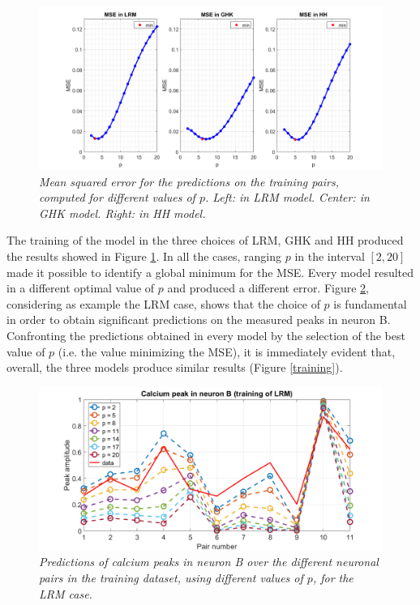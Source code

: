 \documentclass[12pt, a4paper]{report}
\begin{document}
\begin{figure}[H]
	\begin{center}
		\hspace*{-1.6 cm}
		\includegraphics[scale=0.5]{MSE.png} 
	\end{center} 
	\caption{\textit{Mean squared error for the predictions on the training pairs, computed for different values of $p$. Left: in LRM model. Center: in GHK model. Right: in HH model. }}
	\label{mse}
\end{figure}

The training of the model in the three choices of LRM, GHK and HH produced the results showed in Figure \ref{mse}. In all the cases, ranging $p$ in the interval $[2,20]$ made it possible to identify a global minimum for the MSE. Every model resulted in a different optimal value of $p$ and produced a different error. Figure \ref{training_LRM}, considering as example the LRM case, shows that the choice of $p$ is fundamental in order to obtain significant predictions on the measured peaks in neuron B.\\ Confronting the predictions obtained in every model by the selection of the best value of $p$ (i.e. the value minimizing the MSE), it is immediately evident that, overall, the three models produce similar results  (Figure \ref{training}).
\begin{figure}[H]
	\begin{center}
		\hspace*{-1.5 cm}
		\includegraphics[scale=0.5]{training_LRM.png} 
	\end{center} 
	\caption{\textit{Predictions of calcium peaks in neuron B over the different neuronal pairs in the training dataset, using different values of $p$, for the LRM case.}}
	\label{training_LRM}
\end{figure}
\end{document}
